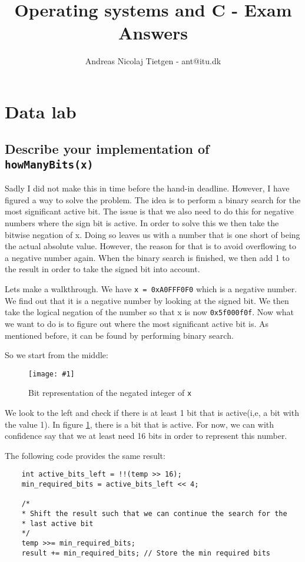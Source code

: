 \documentclass[11pt]{article}
\title{Operating systems and C - Exam Answers}
\author{Andreas Nicolaj Tietgen - ant@itu.dk}
\newcommand{\code}[1]{{\colorbox{lightgray!15}{\color{orange}\texttt{#1}}}}
\newcommand{\centeredpic}[3]{
    \begin{figure}[h]
        \texttt{[image: \#1]}
        \centering
        \caption{#2}
        \label{fig:#3}
    \end{figure}
}
\begin{document}
\maketitle

\tableofcontents

\section{Data lab}

\subsection{Describe your implementation of \code{howManyBits(x)}}
Sadly I did not make this in time before the hand-in deadline. However, I have figured a way to 
solve the problem. The idea is to perform a binary search for the most significant active bit.
The issue is that we also need to do this for negative numbers where the sign bit is active. In order to 
solve this we then take the bitwise negation of x. Doing so leaves us with a number that is one short of being the
actual absolute value. However, the reason for that is to avoid overflowing to a negative number again. 
When the binary search is finished, we then add 1 to the result in order to take the signed bit into account.

Lets make a walkthrough. We have \code{x = 0xA0FFF0F0} which is a negative number.
We find out that it is a negative number by looking at the signed bit. We then take the
logical negation of the number so that x is now \code{0x5f000f0f}. 
Now what we want to do is to figure out where the most significant active bit is. As mentioned before,
it can be found by performing binary search. 

So we start from the middle:

\centeredpic{howmanybits-01.png}{Bit representation of the negated integer of \code{x}}{hmb-step-1}

We look to the left and check if there is at least 1 bit that is active(i,e, a bit with the value 1). In figure \ref{fig:hmb-step-1}, there is a bit that is active.
For now, we can with confidence say that we at least need 16 bits in order to represent this number.

The following code provides the same result:
\begin{lstlisting}
    int active_bits_left = !!(temp >> 16);
    min_required_bits = active_bits_left << 4;
    
    /* 
    * Shift the result such that we can continue the search for the 
    * last active bit 
    */
    temp >>= min_required_bits;
    result += min_required_bits; // Store the min required bits
\end{lstlisting}
\end{document}
